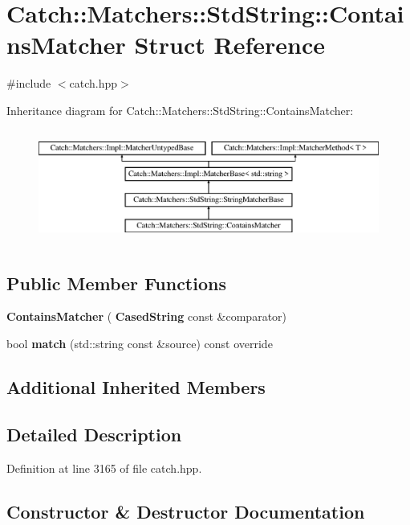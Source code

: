 \section{Catch\+::Matchers\+::Std\+String\+::Contains\+Matcher Struct Reference}
\label{struct_catch_1_1_matchers_1_1_std_string_1_1_contains_matcher}


{\ttfamily \#include $<$catch.\+hpp$>$}

Inheritance diagram for Catch\+::Matchers\+::Std\+String\+::Contains\+Matcher\+:\begin{figure}[H]
\begin{center}
\leavevmode
\includegraphics[height=3.758389cm]{struct_catch_1_1_matchers_1_1_std_string_1_1_contains_matcher}
\end{center}
\end{figure}
\subsection*{Public Member Functions}
\begin{DoxyCompactItemize}
\item 
\textbf{ Contains\+Matcher} (\textbf{ Cased\+String} const \&comparator)
\item 
bool \textbf{ match} (std\+::string const \&source) const override
\end{DoxyCompactItemize}
\subsection*{Additional Inherited Members}


\subsection{Detailed Description}


Definition at line 3165 of file catch.\+hpp.



\subsection{Constructor \& Destructor Documentation}
\mbox{\label{struct_catch_1_1_matchers_1_1_std_string_1_1_contains_matcher_acc892883c8409e34b28c9b39d4ef1fe3}} 
